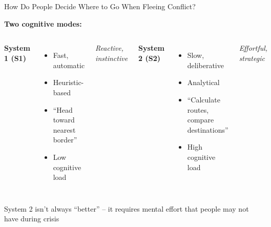 \documentclass[aspectratio=169]{beamer}
\begin{document}
\begin{frame}{How Do People Decide Where to Go When Fleeing Conflict?}

\textbf{Two cognitive modes:}

\begin{columns}[T]
\textbf{System 1 (S1)}
\begin{itemize}
    \item Fast, automatic
    \item Heuristic-based
    \item ``Head toward nearest border''
    \item Low cognitive load
\end{itemize}

\vspace{0.5em}
\textit{Reactive, instinctive}

\textbf{System 2 (S2)}
\begin{itemize}
    \item Slow, deliberative
    \item Analytical
    \item ``Calculate routes, compare destinations''
    \item High cognitive load
\end{itemize}

\vspace{0.5em}
\textit{Effortful, strategic}
\end{columns}

\vspace{1em}

\centering
\alert{System 2 isn't always ``better'' – it requires mental effort that people may not have during crisis}

\end{frame}
\end{document}
